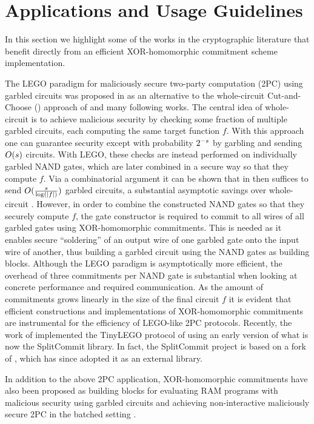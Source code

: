 
\section{Applications and Usage Guidelines}
In this section we highlight some of the works in the cryptographic literature that benefit directly from an efficient XOR-homomorphic commitment scheme implementation.

The LEGO paradigm for maliciously secure two-party computation (2PC) using garbled circuits was proposed in \cite{DBLP:conf/tcc/NielsenO09} as an alternative to the whole-circuit Cut-and-Choose (\CC) approach of \cite{DBLP:conf/eurocrypt/LindellP07} and many following works. The central idea of whole-circuit \CC is to achieve malicious security by checking some fraction of multiple garbled circuits, each computing the same target function $f$. With this approach one can guarantee security except with probability $2^{-s}$ by garbling and sending $O(s)$ circuits. With LEGO, these checks are instead performed on individually garbled NAND gates, which are later combined in a secure way so that they compute $f$. Via a combinatorial argument it can be shown that in then suffices to send $O(\frac{s}{\log(|f|)})$ garbled circuits, a substantial asymptotic savings over whole-circuit \CC. However, in order to combine the constructed NAND gates so that they securely compute $f$, the gate constructor is required to commit to all wires of all garbled gates using XOR-homomorphic commitments. This is needed as it enables secure ``soldering'' of an output wire of one garbled gate onto the input wire of another, thus building a garbled circuit using the NAND gates as building blocks. Although the LEGO paradigm is asymptotically more efficient, the overhead of three commitments per NAND gate is substantial when looking at concrete performance and required communication. As the amount of commitments grows linearly in the size of the final circuit $f$ it is evident that efficient constructions and implementations of XOR-homomorphic commitments are instrumental for the efficiency of LEGO-like 2PC protocols. Recently, the work of \cite{NST17} implemented the TinyLEGO protocol of \cite{DBLP:journals/iacr/FrederiksenJNT15} using an early version of what is now the SplitCommit library. In fact, the SplitCommit project is based on a fork of \cite{NST17}, which has since adopted it as an external library.

In addition to the above 2PC application, XOR-homomorphic commitments have also been proposed as building blocks for evaluating RAM programs with malicious security using garbled circuits \cite{DBLP:conf/eurocrypt/AfsharHMR15} and achieving non-interactive maliciously secure 2PC in the batched setting \cite{DBLP:journals/iacr/MohasselR17}.